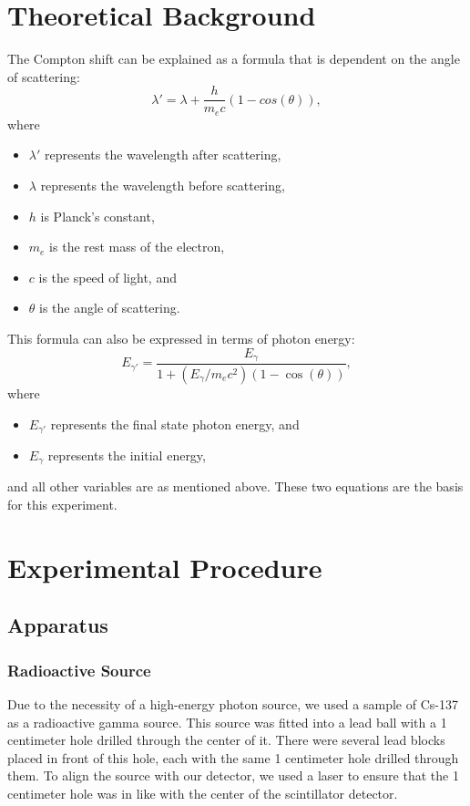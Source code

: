 \documentclass[10pt,letterpaper,onecolumn]{article}
\begin{document}
\section{Theoretical Background}
The Compton shift can be explained as a formula that is dependent on the angle of scattering:
\begin{equation}
    \label{comptonShiftWavelength} 
    \lambda' = \lambda + \frac{h}{m_e c}(1 - cos(\theta)),
\end{equation}
where 
\begin{itemize}
\item $\lambda'$ represents the wavelength after scattering, 
\item $\lambda$ represents the wavelength before scattering, 
\item $h$ is Planck's constant,
\item $m_e$ is the rest mass of the electron,
\item $c$ is the speed of light, and
\item $\theta$ is the angle of scattering.
\end{itemize}
This formula can also be expressed in terms of photon energy:
\begin{equation}
    \label{comptonShiftEnergy} 
    E_{\gamma'} = \frac{E_{\gamma}}{1 + \left( {E_{\gamma}}/{m_e c^2} \right)(1 - \cos(\theta))},
\end{equation}
where 
\begin{itemize}
\item $ E_{\gamma'}$ represents the final state photon energy, and
\item $E_{\gamma}$ represents the initial energy, 
\end{itemize}
and all other variables are as mentioned above. 
\cite{Taylor2004ModernPhysics}
These two equations are the basis for this experiment.
\section{Experimental Procedure}
\subsection{Apparatus}
\subsubsection*{Radioactive Source}
Due to the necessity of a high-energy photon source, we used a sample of Cs-137 as a radioactive gamma source. This source was fitted into a lead ball with a 1 centimeter hole drilled through the center of it. There were several lead blocks placed in front of this hole, each with the same 1 centimeter hole drilled through them. To align the source with our detector, we used a laser to ensure that the 1 centimeter hole was in like with the center of the scintillator detector. 
\end{document}
